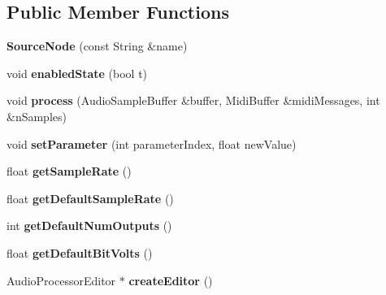 \subsection*{Public Member Functions}
\begin{DoxyCompactItemize}
\item 
\hypertarget{classSourceNode_ab4f329f2c043ff22b7111b2d4f858914}{{\bfseries Source\-Node} (const String \&name)}\label{classSourceNode_ab4f329f2c043ff22b7111b2d4f858914}

\item 
\hypertarget{classSourceNode_af79d18af3b7ccc5d429ec9821c8ed8e0}{void {\bfseries enabled\-State} (bool t)}\label{classSourceNode_af79d18af3b7ccc5d429ec9821c8ed8e0}

\item 
\hypertarget{classSourceNode_a7878b4b9142e39d9bf2ffc583ba09330}{void {\bfseries process} (Audio\-Sample\-Buffer \&buffer, Midi\-Buffer \&midi\-Messages, int \&n\-Samples)}\label{classSourceNode_a7878b4b9142e39d9bf2ffc583ba09330}

\item 
\hypertarget{classSourceNode_a188872e7c56ea9d8408228632cedd95d}{void {\bfseries set\-Parameter} (int parameter\-Index, float new\-Value)}\label{classSourceNode_a188872e7c56ea9d8408228632cedd95d}

\item 
\hypertarget{classSourceNode_a777f8795ab9dc3c9561e60bdcef6a9bb}{float {\bfseries get\-Sample\-Rate} ()}\label{classSourceNode_a777f8795ab9dc3c9561e60bdcef6a9bb}

\item 
\hypertarget{classSourceNode_acaf6815c0144908b659752e474fb1f4e}{float {\bfseries get\-Default\-Sample\-Rate} ()}\label{classSourceNode_acaf6815c0144908b659752e474fb1f4e}

\item 
\hypertarget{classSourceNode_a17ba5887e1fea781462df6225b9b5e0f}{int {\bfseries get\-Default\-Num\-Outputs} ()}\label{classSourceNode_a17ba5887e1fea781462df6225b9b5e0f}

\item 
\hypertarget{classSourceNode_abb6c608b0619608c92985fb3bceef43e}{float {\bfseries get\-Default\-Bit\-Volts} ()}\label{classSourceNode_abb6c608b0619608c92985fb3bceef43e}

\item 
\hypertarget{classSourceNode_a7359ff763096c94605c022b528a66382}{Audio\-Processor\-Editor $\ast$ {\bfseries create\-Editor} ()}\label{classSourceNode_a7359ff763096c94605c022b528a66382}


\end{DoxyCompactItemize}
